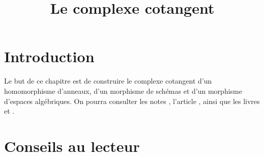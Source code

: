 

%


\title{Le complexe cotangent}


\maketitle

\label{section-phantom}

\tableofcontents

\section{Introduction}
\label{section-introduction}

\noindent
Le but de ce chapitre est de construire le complexe cotangent d'un
homomorphisme d'anneaux, d'un morphisme de schémas et d'un morphisme d'espaces
algébriques. On pourra consulter les notes \cite{quillenhomology}, l'article
\cite{quillencohomology}, ainsi que les livres \cite{Andre} et
\cite{cotangent}.




\section{Conseils au lecteur}
\label{section-advice-reader}

